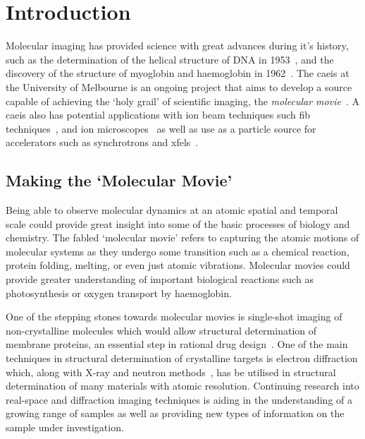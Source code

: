  \chapter{Introduction}
 
\setcounter{page}{1}

Molecular imaging has provided science with great advances during it's history, such as the determination of the helical structure of DNA in 1953~\cite{watson_molecular_1953}, and the discovery of the structure of myoglobin and haemoglobin in 1962~\cite{kendrew_x-ray_1957}.
The \gls{caeis} at the University of Melbourne is an ongoing project that aims to develop a source capable of achieving the `holy grail' of scientific imaging, the \emph{molecular movie}~\cite{dwyer_femtosecond_2006,sciaini_femtosecond_2011}.
A \gls{caeis} also has potential applications with ion beam techniques such \gls{fib} techniques~\cite{mcclelland_bright_2016}, and ion microscopes~\cite{knuffman_cold_2013} as well as use as a particle source for accelerators such as synchrotrons and \glspl{xfel}~\cite{van_oudheusden_electron_2007,zhu_future_2015,mcculloch_cold_2016}.

\section{Making the `Molecular Movie'}

Being able to observe molecular dynamics at an atomic spatial and temporal scale could provide great insight into some of the basic processes of biology and chemistry.
The fabled `molecular movie' refers to capturing the atomic motions of molecular systems as they undergo some transition such as a chemical reaction, protein folding, melting, or even just atomic vibrations.
Molecular movies could provide greater understanding of important biological reactions such as photosynthesis or oxygen transport by haemoglobin.

One of the stepping stones towards molecular movies is single-shot imaging of non-crystalline molecules which would allow structural determination of membrane proteins, an essential step in rational drug design~\cite{hardy_atomic_1987, barrett_discovering_1999, pinto_influenza_1992}.
One of the main techniques in structural determination of crystalline targets is electron diffraction which, along with X-ray and neutron methods~\cite{cullity_elements_2001,bacon_x-ray_2013}, has be utilised in structural determination of many materials with atomic resolution.
Continuing research into real-space and diffraction imaging techniques is aiding in the understanding of a growing range of samples as well as providing new types of information on the sample under investigation.


